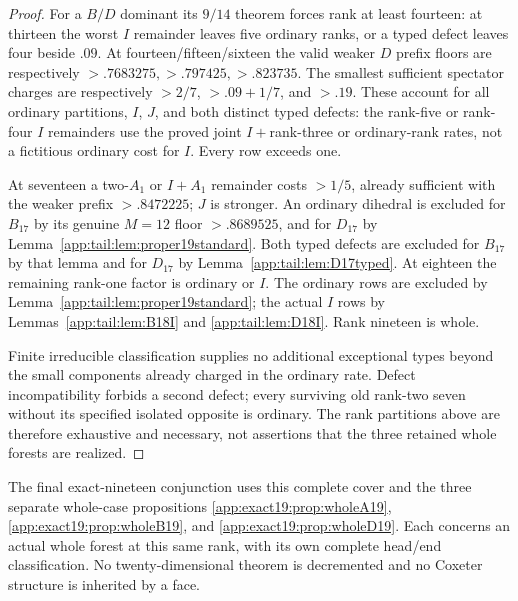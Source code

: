 \begin{proof}
For a $B/D$ dominant its $9/14$ theorem forces rank at least
fourteen: at thirteen the worst $I$ remainder leaves five
ordinary ranks, or a typed defect leaves four beside $.09$.
At fourteen/fifteen/sixteen the valid weaker $D$ prefix
floors are respectively
$>.7683275,>.797425,>.823735$.
The smallest sufficient spectator charges are respectively
$>2/7$, $>.09+1/7$, and $>.19$.
These account for all ordinary partitions, $I$, $J$, and
both distinct typed defects: the rank-five or rank-four
$I$ remainders use the proved joint $I+$rank-three or
ordinary-rank rates, not a fictitious ordinary cost for $I$.
Every row exceeds one.

At seventeen a two-$A_1$ or $I+A_1$ remainder costs $>1/5$,
already sufficient with the weaker prefix $>.8472225$;
$J$ is stronger. An ordinary dihedral is excluded for
$B_{17}$ by its genuine $M=12$ floor $>.8689525$, and for
$D_{17}$ by Lemma~\ref{app:tail:lem:proper19standard}.
Both typed defects are excluded for $B_{17}$ by that lemma
and for $D_{17}$ by Lemma~\ref{app:tail:lem:D17typed}.
At eighteen the remaining rank-one factor is ordinary or
$I$. The ordinary rows are excluded by
Lemma~\ref{app:tail:lem:proper19standard}; the actual $I$
rows by Lemmas~\ref{app:tail:lem:B18I} and
\ref{app:tail:lem:D18I}. Rank nineteen is whole.

Finite irreducible classification supplies no additional
exceptional types beyond the small components already charged
in the ordinary rate. Defect incompatibility forbids a second
defect; every surviving old rank-two seven without its specified
isolated opposite is ordinary. The rank partitions above are
therefore exhaustive and necessary, not assertions that the
three retained whole forests are realized.
\end{proof}

The final exact-nineteen conjunction uses this complete cover and
the three separate whole-case propositions
\ref{app:exact19:prop:wholeA19},
\ref{app:exact19:prop:wholeB19}, and
\ref{app:exact19:prop:wholeD19}.
Each concerns an actual whole forest at this same rank, with its
own complete head/end classification. No twenty-dimensional theorem
is decremented and no Coxeter structure is inherited by a face.

